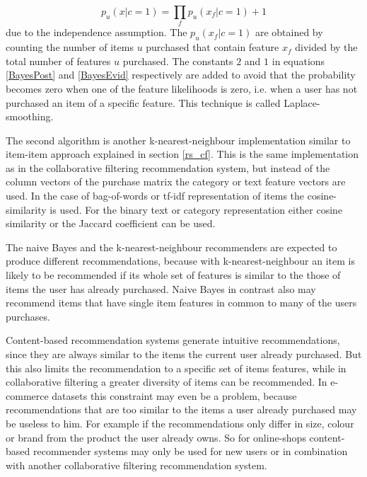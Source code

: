 \documentclass[10pt]{reportMaster}
\begin{document}
\begin{equation}
\label{BayesEvid}
p_u(x|c=1) = \prod_f{p_u(x_f|c=1)+1}
\end{equation}
due to the independence assumption.
The $p_u(x_f|c=1)$ are obtained by counting the number of items $u$ purchased that contain feature $x_f$ divided by the total number of features $u$ purchased.
The constants $2$ and $1$ in equations \ref{BayesPost} and \ref{BayesEvid} respectively are added to avoid that the probability becomes zero when one of the feature likelihoods is zero, i.e. when a user has not purchased an item of a specific feature.
This technique is called Laplace-smoothing. %

The second algorithm is another k-nearest-neighbour implementation similar to item-item approach explained in section \ref{rs_cf}.
This is the same implementation as in the collaborative filtering recommendation system, but instead of the column vectors of the purchase matrix the category or text feature vectors are used.
In the case of bag-of-words or tf-idf representation of items the cosine-similarity is used.
For the binary text or category representation either cosine similarity or the Jaccard coefficient can be used.

The naive Bayes and the k-nearest-neighbour recommenders are expected to produce different recommendations, because with k-nearest-neighbour an item is likely to be recommended if its whole set of features is similar to the those of items the user has already purchased.
Naive Bayes in contrast also may recommend items that have single item features in common to many of the users purchases.

Content-based recommendation systems generate intuitive recommendations, since they are always similar to the items the current user already purchased.
But this also limits the recommendation to a specific set of items features, while in collaborative filtering a greater diversity of items can be recommended.
In e-commerce datasets this constraint may even be a problem, because recommendations that are too similar to the items a user already purchased may be useless to him.
For example if the recommendations only differ in size, colour or brand from the product the user already owns.
So for online-shops content-based recommender systems may only be used for new users or in combination with another collaborative filtering recommendation system. %

\end{document}
